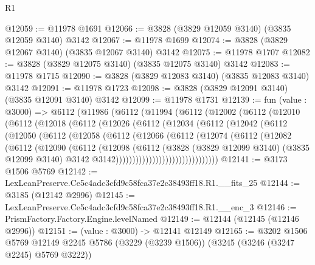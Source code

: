 \begin{lexlean}{R1}
\begin{coremodule}
@12059 := @11978 @1691
@12066 := @3828 (@3829 @12059 @3140) (@3835 @12059 @3140) @3142
@12067 := @11978 @1699
@12074 := @3828 (@3829 @12067 @3140) (@3835 @12067 @3140) @3142
@12075 := @11978 @1707
@12082 := @3828 (@3829 @12075 @3140) (@3835 @12075 @3140) @3142
@12083 := @11978 @1715
@12090 := @3828 (@3829 @12083 @3140) (@3835 @12083 @3140) @3142
@12091 := @11978 @1723
@12098 := @3828 (@3829 @12091 @3140) (@3835 @12091 @3140) @3142
@12099 := @11978 @1731
@12139 := fun (value : @3000) =>
  @6112
    (@11986
      (@6112
        (@11994
          (@6112
            (@12002
              (@6112
                (@12010
                  (@6112
                    (@12018
                      (@6112
                        (@12026
                          (@6112
                            (@12034
                              (@6112
                                (@12042
                                  (@6112
                                    (@12050
                                      (@6112
                                        (@12058
                                          (@6112
                                            (@12066
                                              (@6112
                                                (@12074
                                                  (@6112
                                                    (@12082
                                                      (@6112
                                                        (@12090
                                                          (@6112
                                                            (@12098
                                                              (@6112
                                                                (@3828
                                                                  (@3829 @12099 @3140)
                                                                  (@3835 @12099 @3140)
                                                                  @3142
                                                                  @3142)))))))))))))))))))))))))))))))
@12141 := @3173 @1506 @5769
@12142 := LexLeanPreserve.Ce5c4adc3cfd9c58fca37e2c38493ff18.R1.__fits_25
@12144 := @3185 (@12142 @2996)
@12145 := LexLeanPreserve.Ce5c4adc3cfd9c58fca37e2c38493ff18.R1.__enc_3
@12146 := PrismFactory.Factory.Engine.levelNamed
@12149 := @12144 (@12145 (@12146 @2996))
@12151 := (value : @3000) -> @12141 @12149
@12165 := @3202
    @1506
    @5769
    @12149
    @2245
    @5786
    (@3229 (@3239 @1506))
    (@3245 (@3246 (@3247 @2245) @5769 @3222))

\end{coremodule}
\end{lexlean}
